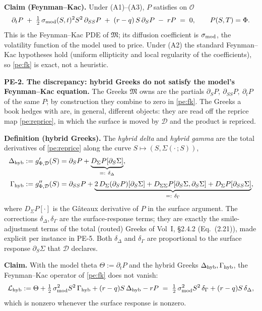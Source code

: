 \textbf{Claim (Feynman--Kac).} Under (A1)--(A3), $P$ satisfies on $\mathcal{O}$
\begin{equation}\label{pe:fk}
  \partial_t P \;+\; \tfrac12\,\sigma_{\mathrm{mod}}(S,t)^2 S^2\,\partial_{SS}P
  \;+\; (r-q)\,S\,\partial_S P \;-\; rP \;=\; 0,
  \qquad P(S,T)=\Phi .
\end{equation}
This is the Feynman--Kac PDE of $\mathfrak{M}$; its diffusion coefficient is
$\sigma_{\mathrm{mod}}$, the volatility function of the model used to price. Under (A2) the
standard Feynman--Kac hypotheses hold (uniform ellipticity and local
regularity of the coefficients), so \eqref{pe:fk} is exact, not a heuristic.

\textbf{PE-2. The discrepancy: hybrid Greeks do not satisfy the
model's Feynman--Kac equation.} The Greeks $\mathfrak{M}$ owns are the partials
$\partial_S P,\ \partial_{SS}P,\ \partial_t P$ of the same $P$; by construction
they combine to zero in \eqref{pe:fk}. The Greeks a book hedges with are, in
general, different objects: they are read off the reprice map
\eqref{pe:reprice}, in which the surface is moved by $\mathcal{D}$ and the
product is repriced.

\textbf{Definition (hybrid Greeks).} The \emph{hybrid delta} and \emph{hybrid
gamma} are the total derivatives of \eqref{pe:reprice} along the curve
$S\mapsto(S,\Sigma(\cdot\,;S))$,
\begin{align}
  \Delta_{\mathrm{hyb}} &:= g_{\Phi,\mathcal D}'(S)
        = \partial_S P + \underbrace{D_\Sigma P[\partial_S\Sigma]}_{=:~\delta_\Delta},
        \label{pe:dhyb}\\[2pt]
  \Gamma_{\mathrm{hyb}} &:= g_{\Phi,\mathcal D}''(S)
        = \partial_{SS}P + \underbrace{2\,D_\Sigma(\partial_S P)[\partial_S\Sigma]
          + D_{\Sigma\Sigma}P[\partial_S\Sigma,\partial_S\Sigma]
          + D_\Sigma P[\partial_{SS}\Sigma]}_{=:~\delta_\Gamma},
        \label{pe:ghyb}
\end{align}
where $D_\Sigma P[\cdot]$ is the G\^ateaux derivative of $P$ in the surface
argument. The corrections $\delta_\Delta,\delta_\Gamma$ are the surface-response
terms; they are exactly the smile-adjustment terms of the total (routed)
Greeks of Vol~I, \S2.4.2 (Eq.~(2.21)), made explicit per instance in PE-5. Both
$\delta_\Delta$ and $\delta_\Gamma$ are proportional to the surface response
$\partial_S\Sigma$ that $\mathcal{D}$ declares.

\textbf{Claim.} With the model theta $\Theta := \partial_t P$ and the hybrid
Greeks $\Delta_{\mathrm{hyb}},\Gamma_{\mathrm{hyb}}$, the Feynman--Kac operator of \eqref{pe:fk} does not
vanish:
\begin{equation}\label{pe:residual-operator}
  \mathcal{L}_{\mathrm{hyb}}
  := \Theta + \tfrac12\,\sigma_{\mathrm{mod}}^2 S^2\,\Gamma_{\mathrm{hyb}} + (r-q)S\,\Delta_{\mathrm{hyb}} - rP
  \;=\; \tfrac12\,\sigma_{\mathrm{mod}}^2 S^2\,\delta_\Gamma + (r-q)S\,\delta_\Delta,
\end{equation}
which is nonzero whenever the surface response is nonzero.

